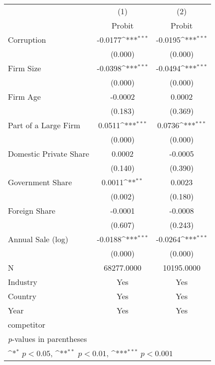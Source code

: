 {
\def\sym#1{\ifmmode^{#1}\else\(^{#1}\)\fi}
\begin{tabular}{l*{2}{c}}
\hline\hline
                    &\multicolumn{1}{c}{(1)}         &\multicolumn{1}{c}{(2)}         \\
                    &      Probit         &      Probit         \\
\hline
Corruption          &     -0.0177\sym{***}&     -0.0195\sym{***}\\
                    &     (0.000)         &     (0.000)         \\
Firm Size           &     -0.0398\sym{***}&     -0.0494\sym{***}\\
                    &     (0.000)         &     (0.000)         \\
Firm Age            &     -0.0002         &      0.0002         \\
                    &     (0.183)         &     (0.369)         \\
Part of a Large Firm&      0.0511\sym{***}&      0.0736\sym{***}\\
                    &     (0.000)         &     (0.000)         \\
Domestic Private Share&      0.0002         &     -0.0005         \\
                    &     (0.140)         &     (0.390)         \\
Government Share    &      0.0011\sym{**} &      0.0023         \\
                    &     (0.002)         &     (0.180)         \\
Foreign Share       &     -0.0001         &     -0.0008         \\
                    &     (0.607)         &     (0.243)         \\
Annual Sale (log)   &     -0.0188\sym{***}&     -0.0264\sym{***}\\
                    &     (0.000)         &     (0.000)         \\
\hline
N                   &  68277.0000         &  10195.0000         \\
Industry            &         Yes         &         Yes         \\
Country             &         Yes         &         Yes         \\
Year                &         Yes         &         Yes         \\
competitor          &                     &                     \\
\hline\hline
\multicolumn{3}{l}{\footnotesize \textit{p}-values in parentheses}\\
\multicolumn{3}{l}{\footnotesize \sym{*} \(p<0.05\), \sym{**} \(p<0.01\), \sym{***} \(p<0.001\)}\\
\end{tabular}
}
